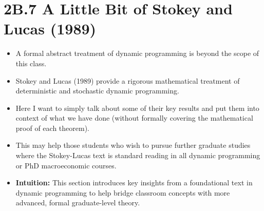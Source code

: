 \documentclass[12pt]{article}
\begin{document}
\section*{\noindent\textbf{2B.7 A Little Bit of Stokey and Lucas (1989)}}

\begin{itemize}
\item A formal abstract treatment of dynamic programming is beyond the scope of this class.

\item Stokey and Lucas (1989) provide a rigorous mathematical treatment of deterministic and stochastic dynamic programming.

\item Here I want to simply talk about some of their key results and put them into context of what we have done (without formally covering the mathematical proof of each theorem).

\item This may help those students who wish to pursue further graduate studies where the Stokey-Lucas text is standard reading in all dynamic programming or PhD macroeconomic courses.

\item \textbf{Intuition:} This section introduces key insights from a foundational text in dynamic programming to help bridge classroom concepts with more advanced, formal graduate-level theory.
\end{itemize}
\end{document}
